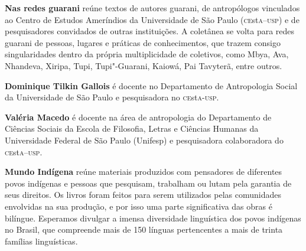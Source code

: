 \textbf{Nas redes guarani} reúne textos de autores guarani, de antropólogos vinculados ao Centro de Estudos Ameríndios da Universidade de São Paulo (\textsc{ce}st\textsc{a}--\textsc{usp}) e de pesquisadores convidados de outras instituições. A coletânea se volta para redes guarani de pessoas, lugares e práticas de conhecimentos, que trazem consigo singularidades dentro da própria multiplicidade de coletivos, como Mbya, Ava, Nhandeva, Xiripa, Tupi, Tupi"-Guarani, Kaiowá, Pai Tavyterã, entre outros. 

\textbf{Dominique Tilkin Gallois} é docente no Departamento de Antropologia Social da Universidade de São Paulo e pesquisadora no \textsc{ce}st\textsc{a}-\textsc{usp}.

\textbf{Valéria Macedo} é docente na área de antropologia do Departamento de Ciências Sociais da Escola de Filosofia, Letras e Ciências Humanas da Universidade Federal de São Paulo (Unifesp) e pesquisadora colaboradora do \textsc{ce}st\textsc{a}--\textsc{usp}.

\textbf{Mundo Indígena} reúne materiais produzidos com pensadores de diferentes povos indígenas e pessoas que pesquisam, trabalham ou lutam pela garantia de seus direitos. Os livros foram feitos para serem utilizados pelas comunidades envolvidas na sua produção, e por isso uma parte significativa das obras é bilíngue. Esperamos divulgar a imensa diversidade linguística dos povos indígenas no Brasil, que compreende mais de 150 línguas pertencentes a mais de trinta famílias linguísticas.




